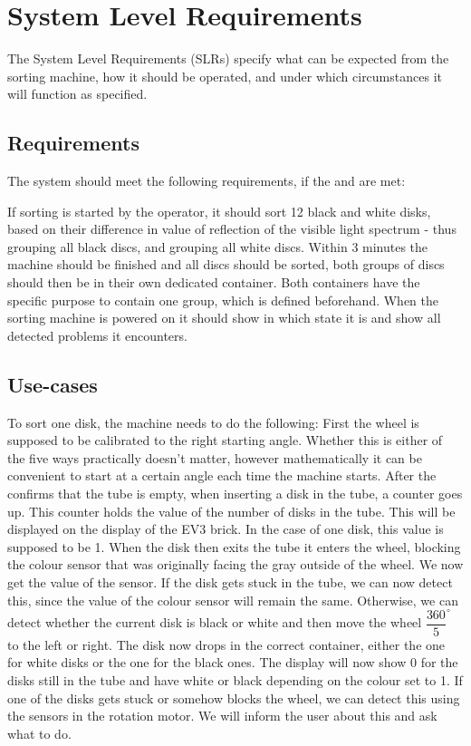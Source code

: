 \section{System Level Requirements} \label{SLR}
The System Level Requirements (SLRs) specify what can be expected from the sorting machine, how it should be operated, and under which circumstances it will function as specified. 

\subsection{Requirements} \label{SLR:requirements}
The system should meet the following requirements, if the  and  are met:\\

\hfill\begin{minipage}{\dimexpr\textwidth-3em}
If sorting is started by the operator, it should sort 12 black and white disks, based on their difference in value of reflection of the visible light spectrum - thus grouping all black discs, and grouping all white discs. Within 3 minutes the machine should be finished and all discs should be sorted, both groups of discs should then be in their own dedicated container. Both containers have the specific purpose to contain one group, which is defined beforehand. When the sorting machine is powered on it should show in which state it is and show all detected problems it encounters.
\end{minipage}

\subsection{Use-cases} \label{SLR:use-cases}
To sort one disk, the machine needs to do the following: First the wheel is supposed to be calibrated to the right starting angle. Whether this is either of the five ways practically doesn't matter, however mathematically it can be convenient to start at a certain angle each time the machine starts. After the 
confirms that the tube is empty, when inserting a disk in the tube, a counter goes up. This counter holds the value of the number of disks in the tube. This will be displayed on the display of the EV3 brick. In the case of one disk, this value is supposed to be 1. When the disk then exits the tube it enters the wheel, blocking the colour sensor that was originally facing the gray outside of the wheel. We now get the value of the sensor. If the disk gets stuck in the tube, we can now detect this, since the value of the colour sensor will remain the same. Otherwise, we can detect whether the current disk is black or white and then move the wheel $\dfrac{360}{5}^{\circ}$ to the left or right. The disk now drops in the correct container, either the one for white disks or the one for the black ones. The display will now show 0 for the disks still in the tube and have white or black depending on the colour set to 1. If one of the disks gets stuck or somehow blocks the wheel, we can detect this using the sensors in the rotation motor. We will inform the user about this and ask what to do.

